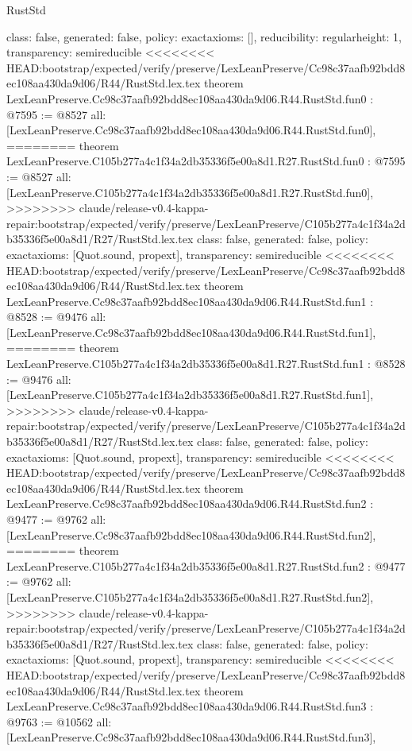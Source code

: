 \begin{lexlean}{RustStd}
\begin{coremodule}
{\begin{coremodule}
{{{  class: false,
  generated: false,
  policy: exact{axioms: []},
  reducibility: regular{height: 1},
  transparency: semireducible
}
<<<<<<<< HEAD:bootstrap/expected/verify/preserve/LexLeanPreserve/Cc98c37aafb92bdd8ec108aa430da9d06/R44/RustStd.lex.tex
theorem LexLeanPreserve.Cc98c37aafb92bdd8ec108aa430da9d06.R44.RustStd.fun0 : @7595 := @8527 {
  all: [LexLeanPreserve.Cc98c37aafb92bdd8ec108aa430da9d06.R44.RustStd.fun0],
========
theorem LexLeanPreserve.C105b277a4c1f34a2db35336f5e00a8d1.R27.RustStd.fun0 : @7595 := @8527 {
  all: [LexLeanPreserve.C105b277a4c1f34a2db35336f5e00a8d1.R27.RustStd.fun0],
>>>>>>>> claude/release-v0.4-kappa-repair:bootstrap/expected/verify/preserve/LexLeanPreserve/C105b277a4c1f34a2db35336f5e00a8d1/R27/RustStd.lex.tex
  class: false,
  generated: false,
  policy: exact{axioms: [Quot.sound, propext]},
  transparency: semireducible
}
<<<<<<<< HEAD:bootstrap/expected/verify/preserve/LexLeanPreserve/Cc98c37aafb92bdd8ec108aa430da9d06/R44/RustStd.lex.tex
theorem LexLeanPreserve.Cc98c37aafb92bdd8ec108aa430da9d06.R44.RustStd.fun1 : @8528 := @9476 {
  all: [LexLeanPreserve.Cc98c37aafb92bdd8ec108aa430da9d06.R44.RustStd.fun1],
========
theorem LexLeanPreserve.C105b277a4c1f34a2db35336f5e00a8d1.R27.RustStd.fun1 : @8528 := @9476 {
  all: [LexLeanPreserve.C105b277a4c1f34a2db35336f5e00a8d1.R27.RustStd.fun1],
>>>>>>>> claude/release-v0.4-kappa-repair:bootstrap/expected/verify/preserve/LexLeanPreserve/C105b277a4c1f34a2db35336f5e00a8d1/R27/RustStd.lex.tex
  class: false,
  generated: false,
  policy: exact{axioms: [Quot.sound, propext]},
  transparency: semireducible
}
<<<<<<<< HEAD:bootstrap/expected/verify/preserve/LexLeanPreserve/Cc98c37aafb92bdd8ec108aa430da9d06/R44/RustStd.lex.tex
theorem LexLeanPreserve.Cc98c37aafb92bdd8ec108aa430da9d06.R44.RustStd.fun2 : @9477 := @9762 {
  all: [LexLeanPreserve.Cc98c37aafb92bdd8ec108aa430da9d06.R44.RustStd.fun2],
========
theorem LexLeanPreserve.C105b277a4c1f34a2db35336f5e00a8d1.R27.RustStd.fun2 : @9477 := @9762 {
  all: [LexLeanPreserve.C105b277a4c1f34a2db35336f5e00a8d1.R27.RustStd.fun2],
>>>>>>>> claude/release-v0.4-kappa-repair:bootstrap/expected/verify/preserve/LexLeanPreserve/C105b277a4c1f34a2db35336f5e00a8d1/R27/RustStd.lex.tex
  class: false,
  generated: false,
  policy: exact{axioms: [Quot.sound, propext]},
  transparency: semireducible
}
<<<<<<<< HEAD:bootstrap/expected/verify/preserve/LexLeanPreserve/Cc98c37aafb92bdd8ec108aa430da9d06/R44/RustStd.lex.tex
theorem LexLeanPreserve.Cc98c37aafb92bdd8ec108aa430da9d06.R44.RustStd.fun3 : @9763 := @10562 {
  all: [LexLeanPreserve.Cc98c37aafb92bdd8ec108aa430da9d06.R44.RustStd.fun3],
}}}}}}
\end{coremodule}}
\end{coremodule}
\end{lexlean}
